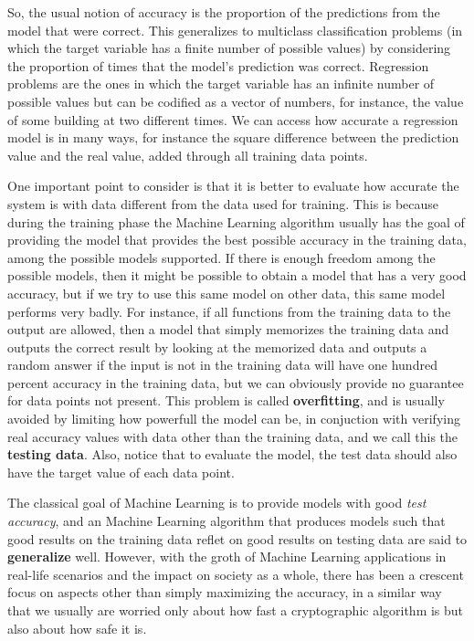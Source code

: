 So, the usual notion of accuracy is the proportion of the predictions from the model that were correct. This generalizes to multiclass classification problems (in which the target variable has a finite number of possible values) by considering the proportion of times that the model's prediction was correct. Regression problems are the ones in which the target variable has an infinite number of possible values but can be codified as a vector of numbers, for instance, the value of some building at two different times. We can access how accurate a regression model is in many ways, for instance the square difference between the prediction value and the real value, added through all training data points.

One important point to consider is that it is better to evaluate how accurate the system is with data different from the data used for training. This is because during the training phase the Machine Learning algorithm usually has the goal of providing the model that provides the best possible accuracy in the training data, among the possible models supported. If there is enough freedom among the possible models, then it might be possible to obtain a model that has a very good accuracy, but if we try to use this same model on other data, this same model performs very badly. For instance, if all functions from the training data to the output are allowed, then a model that simply memorizes the training data and outputs the correct result by looking at the memorized data and outputs a random answer if the input is not in the training data will have one hundred percent accuracy in the training data, but we can obviously provide no guarantee for data points not present. This problem is called \textbf{overfitting}, and is usually avoided by limiting how powerfull the model can be, in conjuction with verifying real accuracy values with data other than the training data, and we call this the \textbf{testing data}. Also, notice that to evaluate the model, the test data should also have the target value of each data point.

The classical goal of Machine Learning is to provide models with good \textit{test accuracy}, and an Machine Learning algorithm that produces models such that good results on the training data reflet on good results on testing data are said to \textbf{generalize} well. However, with the groth of Machine Learning applications in real-life scenarios and the impact on society as a whole, there has been a crescent focus on aspects other than simply maximizing the accuracy, in a similar way that we usually are worried only about how fast a cryptographic algorithm is but also about how safe it is.

